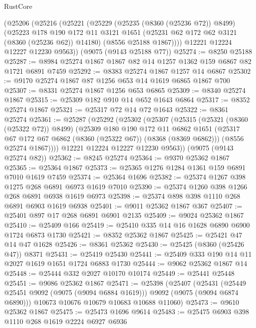 \begin{lexlean}{RustCore}
\begin{coremodule}
    (@25206
      (@25216
        (@25221
          (@25229
            (@25235 (@8360 (@25236 @72)) @8499)
            (@25223
              @178
              @190
              @172
              @11
              @3121
              @1651
              (@25231 @62 @172 @62 @3121 (@8360 (@25236 @62)) @14180)
              (@8556 @25188 @1867))))
        @12221
        @12224
        @12227
        @12230
        @9563))
    (@9075 (@9143 @25188 @77))
@25274 := @8250 @25188
@25287 := @8984 @25274 @1867 @1867 @82 @14 @1257 @1362 @159 @6867 @82 @1721 @6891 @7459
@25292 := @8383 @25274 @1867 @1257 @14 @6867
@25302 := @9170 @25274 @1867 @87 @1256 @653 @14 @1619 @6865 @1867 @700
@25307 := @8331 @25274 @1867 @1256 @653 @6865
@25309 := @8340 @25274 @1867
@25315 := @25309 @182 @910 @14 @652 @1643 @6864
@25317 := @8352 @25274 @1867
@25321 := @25317 @72 @14 @72 @1643
@25322 := @8361 @25274
@25361 := @25287
    (@25292
      (@25302
        (@25307
          (@25315
            (@25321 (@8360 (@25322 @72)) @8499)
            (@25309
              @180
              @190
              @172
              @11
              @6862
              @1651
              (@25317 @67 @172 @67 @6862 (@8360 (@25322 @67)) (@8368 (@8369 @6862)))
              (@8556 @25274 @1867))))
        @12221
        @12224
        @12227
        @12230
        @9563))
    (@9075 (@9143 @25274 @82))
@25362 := @8245 @25274
@25364 := @9370 @25362 @1867
@25365 := @25364 @1867
@25373 := @25365 @1276 @1284 @1361 @159 @6891 @7010 @1619 @7459
@25374 := @25364 @1696
@25382 := @25374 @1267 @398 @1275 @268 @6891 @6973 @1619 @7010
@25390 := @25374 @1260 @398 @1266 @268 @6891 @6938 @1619 @6973
@25398 := @25374 @898 @398 @1110 @268 @6891 @6903 @1619 @6938
@25401 := @9011 @25362 @1867 @367
@25407 := @25401 @897 @17 @268 @6891 @6901 @2135
@25409 := @9024 @25362 @1867
@25410 := @25409 @166
@25419 := @25410 @335 @14 @16 @1628 @6890 @6900 @1724 @6873 @1730
@25421 := @8352 @25362 @1867
@25425 := @25421 @47 @14 @47 @1628
@25426 := @8361 @25362
@25430 := @25425 (@8360 (@25426 @47)) @8371
@25431 := @25419 @25430
@25441 := @25409 @333 @190 @14 @11 @2027 @1619 @1651 @1724 @6883 @1730
@25444 := @9062 @25362 @1867 @14
@25448 := @25444 @332 @2027 @10170 @10174
@25449 := @25441 @25448
@25451 := @9086 @25362 @1867
@25471 := @25398
    (@25407
      (@25431 (@25449 @25451 @9092 (@9075 (@9094 @6884 @1619))) @9092 (@9075 (@9094 @6874 @6890)))
      @10673
      @10676
      @10679
      @10683
      @10688
      @11060)
@25473 := @9610 @25362 @1867
@25475 := @25473 @1696 @9614
@25483 := @25475 @6903 @398 @1110 @268 @1619 @2224 @6927 @6936

\end{coremodule}
\end{lexlean}
